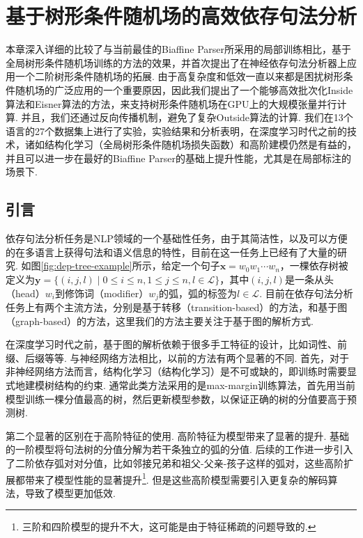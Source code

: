 \chapter{基于树形条件随机场的高效依存句法分析}\label{cha:dep-crf}

本章深入详细的比较了与当前最佳的Biaffine Parser所采用的局部训练相比，基于全局树形条件随机场训练的方法的效果，并首次提出了在神经依存句法分析器上应用一个二阶树形条件随机场的拓展.
由于高复杂度和低效一直以来都是困扰树形条件随机场的广泛应用的一个重要原因，因此我们提出了一个能够高效批次化Inside算法和Eisner算法的方法，来支持树形条件随机场在GPU上的大规模张量并行计算.
并且，我们还通过反向传播机制，避免了复杂Outside算法的计算.
我们在13个语言的27个数据集上进行了实验，实验结果和分析表明，在深度学习时代之前的技术，诸如结构化学习（全局树形条件随机场损失函数）和高阶建模仍然是有益的，并且可以进一步在最好的Biaffine Parser的基础上提升性能，尤其是在局部标注的场景下.

\section{引言}

依存句法分析任务是NLP领域的一个基础性任务，由于其简洁性，以及可以方便的在多语言上获得句法和语义信息的特性，目前在这一任务上已经有了大量的研究. 如图\ref{fig:dep-tree-example}所示，给定一个句子$\boldsymbol{x}=w_0w_1\cdots w_n$，一棵依存树被定义为$\boldsymbol{y}=\{(i,j,l)\mid 0\le i \le n,1 \le j \le n,l \in \mathcal{L}\}$，其中$(i,j,l)$是一条从头（head）$w_i$到修饰词（modifier）$w_j$的弧，弧的标签为$l \in \mathcal{L}$. 目前在依存句法分析任务上有两个主流方法，分别是基于转移（transition-based）的方法，和基于图（graph-based）的方法，这里我们的方法主要关注于基于图的解析方式.

在深度学习时代之前，基于图的解析依赖于很多手工特征的设计，比如词性、前缀、后缀等等.
与神经网络方法相比，以前的方法有两个显著的不同.
首先，对于非神经网络方法而言，结构化学习（结构化学习）是不可或缺的，即训练时需要显式地建模树结构的约束.
通常此类方法采用的是max-margin训练算法，首先用当前模型训练一棵分值最高的树，然后更新模型参数，以保证正确的树的分值要高于预测树.

第二个显著的区别在于高阶特征的使用. 高阶特征为模型带来了显著的提升.
基础的一阶模型将句法树的分值分解为若干条独立的弧的分值\cite{mcdonald-etal-2005-online}. 后续的工作进一步引入了二阶依存弧对对分值，比如邻接兄弟\cite{mcdonald-pereira-2006-online}和祖父-父亲-孩子这样的弧对\cite{carreras-2007-experiments,koo-collins-2010-efficient}，这些高阶扩展都带来了模型性能的显著提升\footnote{三阶和四阶模型的提升不大，这可能是由于特征稀疏的问题导致的\cite{koo-collins-2010-efficient,ma-zhao-2012-fourth}.}. 但是这些高阶模型需要引入更复杂的解码算法，导致了模型更加低效.


